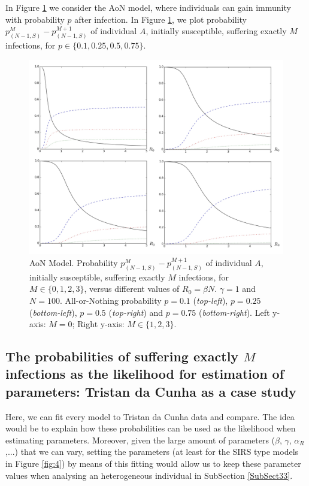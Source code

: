 \documentclass[preprint,12pt]{elsarticle}
\begin{document}
\par In Figure \ref{fig:aon} we consider the AoN model, where individuals can gain immunity with probability $p$ after infection. In Figure \ref{fig:aon}, we plot probability $p_{(N-1,S)}^M-p_{(N-1,S)}^{M+1}$ of individual $A$, initially susceptible, suffering exactly $M$ infections, for $p\in\{0.1,0.25,0.5,0.75\}$.
\begin{figure}[h!]
  \centering
 \includegraphics[width=\textwidth]{AoN.jpg}
 \caption{AoN Model. Probability $p_{(N-1,S)}^M-p_{(N-1,S)}^{M+1}$ of individual $A$, initially susceptible, suffering exactly $M$ infections, for $M\in\{0,1,2,3\}$, versus different values of $R_0=\beta N$. $\gamma=1$ and $N=100$. All-or-Nothing probability $p=0.1$ ({\it top-left}), $p=0.25$ ({\it bottom-left}), $p=0.5$ ({\it top-right}) and
$p=0.75$ ({\it bottom-right}). Left y-axis: $M=0$; Right y-axis: $M\in\{1,2,3\}$.}
 \label{fig:aon}
\end{figure}


\subsection{The probabilities of suffering exactly $M$ infections as the likelihood for estimation of parameters: Tristan da Cunha as a case study}
\label{SubSect32}

\par Here, we can fit every model to Tristan da Cunha data and compare. The idea would be to explain how these probabilities can be used as the likelihood when estimating parameters. Moreover, given the large amount of parameters ($\beta$, $\gamma$, $\alpha_R$,...) that we can vary, setting the parameters (at least for the SIRS type models in Figure \ref{fig:4}) by means of this fitting would allow us to keep these parameter values when analysing an heterogeneous individual in SubSection \ref{SubSect33}.
\end{document}
